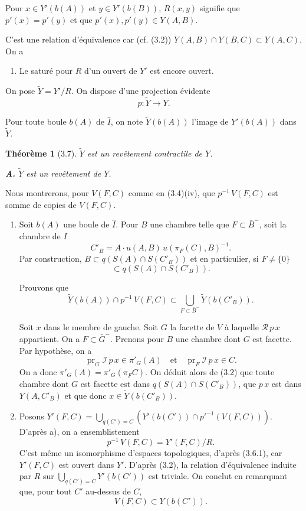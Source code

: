 \documentclass[12pt]{article}
\newtheorem{theoreme}{Théorème}
\theoremstyle{remark}
\begin{document}
Pour $x \in Y'(b(A))$ et $y \in Y'(b(B))$, $R(x, y)$ signifie que $p'(x) = p'(y)$ et que $p'(x), p'(y) \in Y(A, B)$.

C'est une relation d'équivalence car (cf. (3.2)) $Y(A, B) \cap Y(B, C) \subset Y(A, C)$. On a
\begin{enumerate}
\item[(3.6.1)] Le saturé pour $R$ d'un ouvert de $Y'$ est encore ouvert.
\end{enumerate}

On pose $\tilde{Y} = Y'/R$. On dispose d'une projection évidente
\[p \colon \tilde{Y} \to Y.\]

Pour toute boule $b(A)$ de $\hat{I}$, on note $\tilde{Y}(b(A))$ l'image de $Y'(b(A))$ dans $\tilde{Y}$.

\begin{theoreme}[3.7]
$\tilde{Y}$ est un \emph{revêtement contractile} de $Y$.

\textbf{A.} $\tilde{Y}$ est un revêtement de $Y$.
\end{theoreme}

Nous montrerons, pour $V(F, C)$ comme en (3.4)(iv), que $p^{-1} \, V(F, C)$ est somme de copies de $V(F, C)$.

\begin{enumerate}
\item[a)] Soit $b(A)$ une boule de $\hat{I}$. Pour $B$ une chambre telle que $F \subset \bar{B}^-$, soit la chambre de $I$
\[C'_B = A \cdot u(A, B) \, u(\pi_F(C), B)^{-1}.\]
Par construction, $B \subset q(S(A) \cap S(C'_B))$ et en particulier, si $F \neq \{0\}$
\begin{equation}
[F] \subset q(S(A) \cap S(C'_B)).\tag{3.7.1}
\end{equation}

Prouvons que
\begin{equation}
\tilde{Y}(b(A)) \cap p^{-1} \, V(F, C) \subset \bigcup_{F \subset \bar{B}^-} \tilde{Y}(b(C'_B)).\tag{3.7.2}
\end{equation}

Soit $x$ dans le membre de gauche. Soit $G$ la facette de $V$ à laquelle $\mathscr{R} \, p \, x$ appartient. On a $F \subset \bar{G}^-$. Prenons pour $B$ une chambre dont $G$ est facette. Par hypothèse, on a
\[\operatorname{pr}_G \mathscr{I} \, p \, x \in \pi'_G(A) \quad \text{et} \quad \operatorname{pr}_F \mathscr{I} \, p \, x \in C.\]
On a donc $\pi'_G(A) = \pi'_G(\pi_F^{} C)$. On déduit alors de (3.2) que toute chambre dont $G$ est facette est dans $q(S(A) \cap S(C'_B))$, que $p \, x$ est dans $Y(A, C'_B)$ et que donc $x \in \tilde{Y}(b(C'_B))$.

\item[b)] Posons $Y'(F, C) = \bigcup_{q(C') = C} (Y'(b(C')) \cap p'^{-1}(V(F, C)))$. D'après a), on a ensemblistement
\[p^{-1} \, V(F, C) = Y'(F, C)/R.\]
C'est même un isomorphisme d'espaces topologiques, d'après (3.6.1), car $Y'(F, C)$ est ouvert dans $Y'$. D'après (3.2), la relation d'équivalence induite par $R$ sur $\bigcup_{q(C') = C} Y'(b(C'))$ est triviale. On conclut en remarquant que, pour tout $C'$ au-dessus de $C$,
\[V(F, C) \subset Y(b(C')).\]
\end{enumerate}
\end{document}
